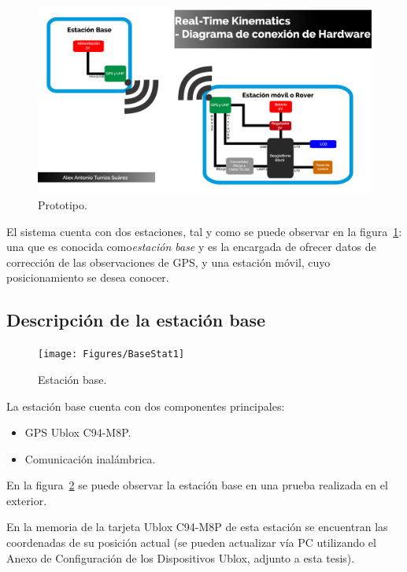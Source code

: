 \begin{figure}[H]
\centering
\includegraphics[scale=0.40]{Figures/DiagFinal}
\caption[Prototipo.]{Prototipo.}
\label{fig:diaghard}
\end{figure}

El sistema cuenta con dos estaciones, tal y como se puede observar en la figura~\ref{fig:diaghard}:  una que es conocida como\textit{estación base} y es la encargada de ofrecer datos de corrección de las observaciones de GPS, y una estación móvil, cuyo posicionamiento se desea conocer. 

\subsection{Descripción de la estación base}

\begin{figure}[H]
\centering
\texttt{[image: Figures/BaseStat1]}
\caption[Estación base.]{Estación base.}
\label{fig:estbase}
\end{figure}

La estación base cuenta con dos componentes principales:

\begin{itemize}
\item GPS Ublox C94-M8P.
\item Comunicación inalámbrica.
\end{itemize}

En la figura~\ref{fig:estbase} se puede observar la estación base en una prueba realizada en el exterior.

En la memoria de la tarjeta Ublox C94-M8P de esta estación se encuentran las coordenadas de su posición actual (se pueden actualizar vía PC utilizando el Anexo de Configuración de los Dispositivos Ublox, adjunto a esta tesis).\\

